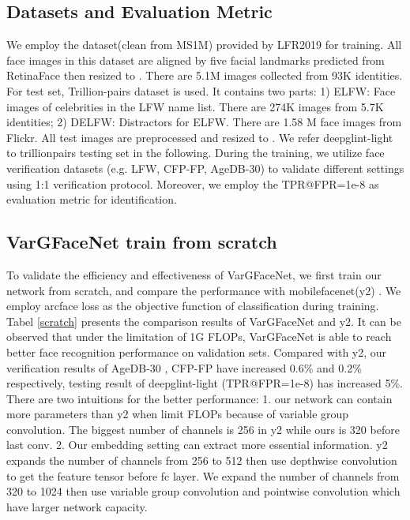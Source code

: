 \documentclass[10pt,twocolumn,letterpaper]{article}
\begin{document}
\subsection{Datasets and Evaluation Metric}
We employ the dataset(clean from MS1M\cite{guo2016ms}) provided by LFR2019 for training. All face images in this dataset are aligned by five facial landmarks predicted from RetinaFace\cite{deng2019retinaface} then resized to . There are 5.1M images collected from 93K identities. For test set, Trillion-pairs dataset \cite{trillionpairs} is used. It contains two parts: 1) ELFW: Face images of celebrities in the LFW name list. There are 274K images from 5.7K identities; 2) DELFW: Distractors for ELFW. There are 1.58 M face images from Flickr. All test images are preprocessed and  resized to . We refer deepglint-light to trillionpairs testing set in the following. During the training, we utilize face verification datasets (e.g. LFW\cite{huang2008labeled}, CFP-FP\cite{sengupta2016frontal}, AgeDB-30\cite{moschoglou2017agedb}) to validate different settings using 1:1 verification protocol. Moreover, we employ the TPR@FPR=1e-8 as evaluation metric for identification.
\subsection{VarGFaceNet train from scratch}
To validate the efficiency and effectiveness of VarGFaceNet, we first train our network from scratch, and compare the performance with mobilefacenet(y2) \cite{chen2018mobilefacenets,arcface}. We employ arcface loss as the objective function of classification during training. Tabel \ref{scratch} presents the comparison results of VarGFaceNet and y2. It can be observed that under the limitation of 1G FLOPs, VarGFaceNet is able to reach better face recognition performance on validation sets. Compared with y2, our verification results of AgeDB-30 , CFP-FP have increased 0.6\% and 0.2\% respectively, testing result of deepglint-light (TPR@FPR=1e-8) has increased 5\%.  There are two intuitions for the better performance: 1. our network can contain more parameters than y2 when limit FLOPs because of variable group convolution. The biggest number of channels is 256 in y2 while ours is 320 before last conv. 2. Our embedding setting can extract more essential information. y2 expands the number of channels from 256 to 512 then use  depthwise convolution to get the feature tensor before fc layer. We expand the number of channels from 320 to 1024 then use variable group convolution and pointwise convolution which have larger network capacity.
\end{document}
